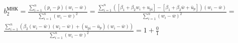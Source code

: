 \documentclass[a4paper,12pt]{article}
\begin{document}
\begin{multline}
  b_2^\text{МНК} =
  \frac{\sum\limits_{i=1}^{n}(p_i-\overline{p})(w_i-\overline{w})}{\sum\limits_{i=1}^{n}(w_i-\overline{w})^2} =
  \frac{\sum\limits_{i=1}^{n}([\beta_1+\beta_2w_i+u_\mathrm{pi}]-[\beta_1+\beta_2\overline{w}+\overline{u}_p])(w_i-\overline{w})}{\sum\limits_{i=1}^{n}(w_i-\overline{w})^2} = \\
  \frac{\sum\limits_{i=1}^{n}(\beta_2(w_i-\overline{w})(w_i-\overline{w})+(u_\mathrm{pi}-\overline{u}_p)(w_i - \overline{w}))}{\sum\limits_{i=1}^{n}(w_i-\overline{w})^2} =
  1 + \frac{0}{1} \\
\end{multline}
\end{document}
